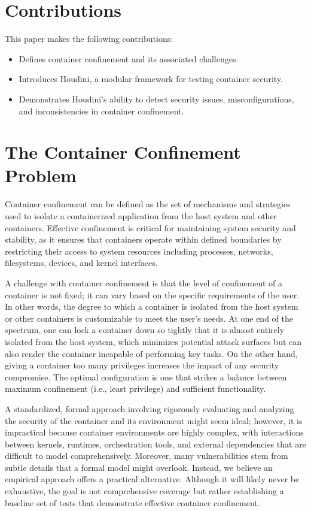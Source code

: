 \documentclass[12pt]{report}
\begin{document}
\begin{doublespace}
\section{Contributions}

This paper makes the following contributions:
\begin{itemize}
    \item Defines container confinement and its associated challenges.
    \item Introduces Houdini, a modular framework for testing container security.
    \item Demonstrates Houdini’s ability to detect security issues, misconfigurations, and inconsistencies in container confinement.
\end{itemize}

\section{The Container Confinement Problem}

Container confinement can be defined as the set of mechanisms and strategies used to isolate a containerized application from the host system and other containers. Effective confinement is critical for maintaining system security and stability, as it ensures that containers operate within defined boundaries by restricting their access to system resources including processes, networks, filesystems, devices, and kernel interfaces. 

A challenge with container confinement is that the level of confinement of a container is not fixed; it can vary based on the specific requirements of the user. In other words, the degree to which a container is isolated from the host system or other containers is customizable to meet the user’s needs. At one end of the spectrum, one can lock a container down so tightly that it is almost entirely isolated from the host system, which minimizes potential attack surfaces but can also render the container incapable of performing key tasks. On the other hand, giving a container too many privileges increases the impact of any security compromise. The optimal configuration is one that strikes a balance between maximum confinement (i.e., least privilege) and sufficient functionality. 


A standardized, formal approach involving rigorously evaluating and analyzing the security of the container and its environment might seem ideal; however, it is impractical because container environments are highly complex, with interactions between kernels, runtimes, orchestration tools, and external dependencies that are difficult to model comprehensively. Moreover, many vulnerabilities stem from subtle details that a formal model might overlook. Instead, we believe an empirical approach offers a practical alternative. Although it will likely never be exhaustive, the goal is not comprehensive coverage but rather establishing a baseline set of tests that demonstrate effective container confinement.




\end{doublespace}
\end{document}
